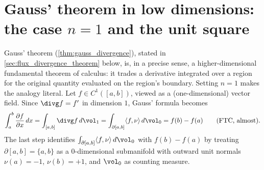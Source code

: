 

\section{Gauss' theorem in low dimensions: the case \texorpdfstring{$n=1$}{n=1} and the unit
square}
\label{sec:gauss_intuition}
%

Gauss' theorem (\cref{thm:gauss_divergence}), stated in \cref{sec:flux_divergence_theorem}
below, is, in a precise sense, a higher-dimensional
fundamental theorem of calculus: it trades a derivative integrated over a region for the
original quantity evaluated on the region's boundary. Setting $n=1$ makes the analogy
literal. Let $f \in C^1([a,b])$, viewed as a (one-dimensional) vector field. Since $\divg f =
f'$ in dimension $1$, Gauss' formula becomes
\[\int_a^b \frac{\partial f}{\partial x}\,dx = \int_{[a,b]} \divg f\,d\vol_1
  = \int_{\partial[a,b]} \langle f,\nu\rangle\,d\vol_0
  = f(b) - f(a) \qquad \text{(FTC, almost).}\]
The last step identifies $\int_{\partial[a,b]} \langle f,\nu\rangle\,d\vol_0$ with $f(b)-f(a)$
by treating $\partial[a,b] = \{a,b\}$ as a $0$-dimensional submanifold with outward unit
normals $\nu(a) = -1$, $\nu(b) = +1$, and $\vol_0$ as counting measure.


